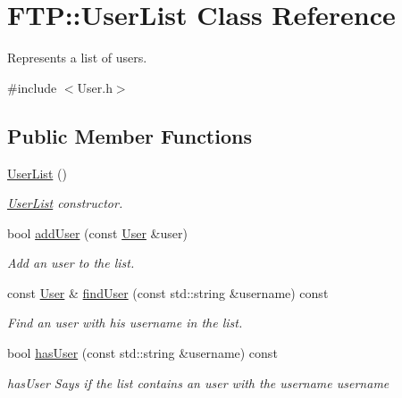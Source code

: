 \hypertarget{classFTP_1_1UserList}{}\section{F\+T\+P\+:\+:User\+List Class Reference}
\label{classFTP_1_1UserList}


Represents a list of users.  




{\ttfamily \#include $<$User.\+h$>$}

\subsection*{Public Member Functions}
\begin{DoxyCompactItemize}
\item 
\hypertarget{classFTP_1_1UserList_af2f3d0d0df23f6a00bea95f0be707601}{}\hyperlink{classFTP_1_1UserList_af2f3d0d0df23f6a00bea95f0be707601}{User\+List} ()\label{classFTP_1_1UserList_af2f3d0d0df23f6a00bea95f0be707601}

\begin{DoxyCompactList}\small\item\em \hyperlink{classFTP_1_1UserList}{User\+List} constructor. \end{DoxyCompactList}\item 
bool \hyperlink{classFTP_1_1UserList_a0427b71d7f5c0ed383cb6254f36d210c}{add\+User} (const \hyperlink{structFTP_1_1User}{User} \&user)
\begin{DoxyCompactList}\small\item\em Add an user to the list. \end{DoxyCompactList}\item 
const \hyperlink{structFTP_1_1User}{User} \& \hyperlink{classFTP_1_1UserList_a260d4aa185854aefa9266e762fb5a0dc}{find\+User} (const std\+::string \&username) const 
\begin{DoxyCompactList}\small\item\em Find an user with his username in the list. \end{DoxyCompactList}\item 
bool \hyperlink{classFTP_1_1UserList_a9b6441c5595dbdcdd872d4c3182da44a}{has\+User} (const std\+::string \&username) const 
\begin{DoxyCompactList}\small\item\em has\+User Says if the list contains an user with the username username \end{DoxyCompactList}\end{DoxyCompactItemize}


